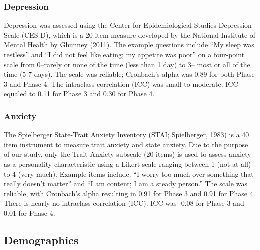 \documentclass[man]{apa6}
\begin{document}
\hypertarget{depression}{%
\subsubsection{Depression}\label{depression}}

Depression was assessed using the Center for Epidemiological Studies-Depression Scale (CES-D), which is a 20-item measure developed by the National Institute of Mental Health by Ghunney (2011). The example questions include \enquote{My sleep was restless} and \enquote{I did not feel like eating; my appetite was poor} on a four-point scale from 0--rarely or none of the time (less than 1 day) to 3-- most or all of the time (5-7 days). The scale was reliable; Cronbach's alpha was 0.89 for both Phase 3 and Phase 4. The intraclass correlation (ICC) was small to moderate. ICC equaled to 0.11 for Phase 3 and 0.30 for Phase 4.

\hypertarget{anxiety}{%
\subsubsection{Anxiety}\label{anxiety}}

The Spielberger State-Trait Anxiety Inventory (STAI; Spielberger, 1983) is a 40 item instrument to measure trait anxiety and state anxiety. Due to the purpose of our study, only the Trait Anxiety subscale (20 items) is used to assess anxiety as a personality characteristic using a Likert scale ranging between 1 (not at all) to 4 (very much). Example items include: \enquote{I worry too much over something that really doesn't matter} and \enquote{I am content; I am a steady person.} The scale was reliable, with Cronbach's alpha resulting in 0.91 for Phase 3 and 0.91 for Phase 4. There is nearly no intraclass correlation (ICC). ICC was -0.08 for Phase 3 and 0.01 for Phase 4.

\hypertarget{demographics}{%
\subsection{Demographics}\label{demographics}}
\end{document}
